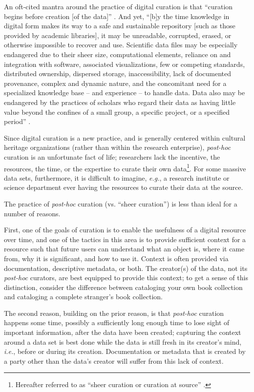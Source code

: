 \documentclass{acm_proc_article-sp}
\begin{document}
An oft-cited mantra around the practice of digital curation is that
``curation begins before creation [of the data]''
\cite{rusbridge:curation}. And yet, ``[b]y the time knowledge in
digital form makes its way to a safe and sustainable repository [such
as those provided by academic libraries], it may be unreadable,
corrupted, erased, or otherwise impossible to recover and
use. Scientific data files may be especially endangered due to their
sheer size, computational elements, reliance on and integration with
software, associated visualizations, few or competing standards,
distributed ownership, dispersed storage, inaccessibility, lack of
documented provenance, complex and dynamic nature, and the concomitant
need for a specialized knowledge base -- and experience -- to handle
data.  Data also may be endangered by the practices of scholars who
regard their data as having little value beyond the confines of a
small group, a specific project, or a specified period''
\cite{ogburn:imperative}.

Since digital curation is a new practice, and is generally centered
within cultural heritage organizations (rather than within the
research enterprise), \textit{post-hoc} curation is an unfortunate
fact of life; researchers lack the incentive, the resources, the time,
or the expertise to curate their own data\footnote{Hereafter referred
  to as ``sheer curation or curation at source''
  \cite{curry:community}.}. For some massive data sets, furthermore,
it is difficult to imagine, \textit{e.g.}, a research institute or
science department ever having the resources to curate their data at
the source.

The practice of \textit{post-hoc} curation (vs. ``sheer curation'') is
less than ideal for a number of reasons.

First, one of the goals of curation is to enable the usefulness of a
digital resource over time, and one of the tactics in this area is to
provide sufficient context for a resource such that future users can
understand what an object is, where it came from, why it is
significant, and how to use it. Context is often provided via
documentation, descriptive metadata, or
both\cite{arl:stewardship,heidorn:libraries,curry:community,jisc:deluge}. The
creator(s) of the data, not its \textit{post-hoc} curators, are best
equipped to provide this context; to get a sense of this distinction,
consider the difference between cataloging your own book collection
and cataloging a complete stranger's book collection.

The second reason, building on the prior reason, is that
\textit{post-hoc} curation happens some time, possibly a sufficiently
long enough time to lose sight of important information, after the
data have been created; capturing the context around a data set is
best done while the data is still fresh in its creator's mind,
\textit{i.e.}, before or during its creation. Documentation or
metadata that is created by a party other than the data's creator will
suffer from this lack of context.
\end{document}
